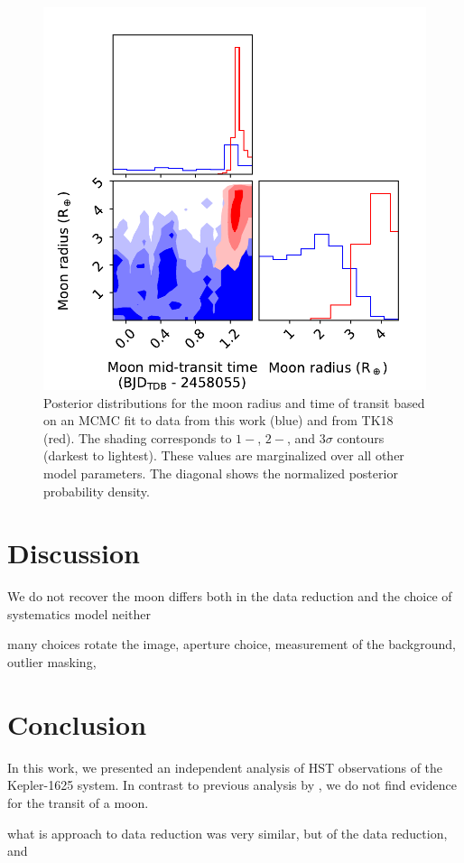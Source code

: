 \documentclass[twocolumn]{aastex62}
\begin{document}
\begin{figure}
\includegraphics[width = 0.5 \textwidth]{figures/fig5_pairs.pdf}
    \caption{Posterior distributions for the moon radius and time of transit based on an MCMC fit to data from this work (blue) and from TK18 (red). The shading corresponds to $1-$, $2-$, and $3\sigma$ contours (darkest to lightest). These values are marginalized over all other model parameters. The diagonal shows the normalized posterior probability density.}
\label{fig:corner}
\end{figure}

\section{Discussion}
We  do not recover the moon
differs both in the data reduction and the choice of systematics model
neither 


many choices
rotate the image, aperture choice, measurement of the background, outlier masking, 


\section{Conclusion}
In this work, we presented an independent analysis of HST observations of the Kepler-1625 system. In contrast to previous analysis by \citep{teachey18b}, we do not find evidence for the transit of a moon.

what is 
approach to data reduction was very similar, but of the data reduction, and 
\end{document}
